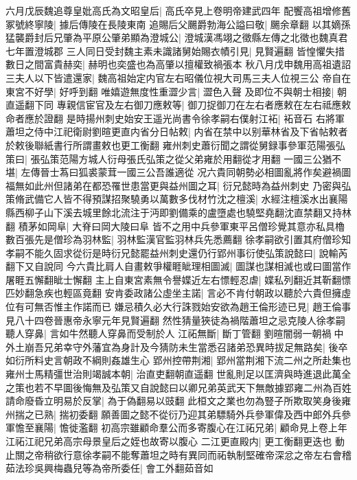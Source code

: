 六月戊辰魏追尊皇妣高氏為文昭皇后|{
	高氏卒見上卷明帝建武四年}
配饗高祖增修舊冢號終寧陵|{
	據后傳陵在長陵東南}
追賜后父颺爵勃海公謚曰敬|{
	颺余章翻}
以其嫡孫猛襲爵封后兄肇為平原公肇弟顯為澄城公|{
	澄城漢馮翊之徵縣左傳之北徵也魏真君七年置澄城郡}
三人同日受封魏主素未識諸舅始賜衣幘引見|{
	見賢遍翻}
皆惶懼失措數日之間富貴赫奕|{
	赫明也奕盛也為高肇以擅權致禍張本}
秋八月戊申魏用高祖遺詔三夫人以下皆遣還家|{
	魏高祖始定内官左右昭儀位視大司馬三夫人位視三公}
帝自在東宮不好學|{
	好呼到翻}
唯嬉遊無度性重澀少言|{
	澀色入聲}
及即位不與朝士相接|{
	朝直遥翻下同}
專親信宦官及左右御刀應敕等|{
	御刀捉御刀在左右者應敕在左右祗應敕命者應於證翻}
是時揚州刺史始安王遥光尚書令徐孝嗣右僕射江袥|{
	袥音石}
右將軍蕭坦之侍中江祀衛尉劉暄更直内省分日帖敕|{
	内省在禁中以别華林省及下省帖敕者於敕後聯紙書行所謂畫敕也更工衡翻}
雍州刺史蕭衍聞之謂從舅録事參軍范陽張弘策曰|{
	張弘策范陽方城人衍母張氏弘策之從父弟雍於用翻從才用翻}
一國三公猶不堪|{
	左傳晉士蒍曰狐裘蒙茸一國三公吾誰適從}
况六貴同朝勢必相圖亂將作矣避禍圖福無如此州但諸弟在都恐罹世患當更與益州圖之耳|{
	衍兄懿時為益州刺史}
乃密與弘策脩武備它人皆不得預謀招聚驍勇以萬數多伐材竹沈之檀溪|{
	水經注檀溪水出襄陽縣西柳子山下溪去城里餘北流注于沔即劉備乘的盧墮處也驍堅堯翻沈直禁翻又持林翻}
積茅如岡阜|{
	大脊曰岡大陵曰阜}
皆不之用中兵參軍東平呂僧珍覺其意亦私具櫓數百張先是僧珍為羽林監|{
	羽林監漢官監羽林兵先悉薦翻}
徐孝嗣欲引置其府僧珍知孝嗣不能久固求從衍是時衍兄懿罷益州刺史還仍行郢州事衍使弘策說懿曰|{
	說輸芮翻下又自說同}
今六貴比肩人自畫敕爭權睚眦理相圖滅|{
	圖謀也謀相滅也或曰圖當作屠睚五懈翻眦士懈翻}
主上自東宮素無令譽媟近左右慓輕忍虐|{
	媟私列翻近其靳翻慓匹妙翻急疾也輕區竟翻}
安肯委政諸公虛坐主諾|{
	言必不肯付朝政以聽於六貴但擁虛位有可無否惟主作諾而已}
嫌忌積久必大行誅戮始安欲為趙王倫形迹已見|{
	趙王倫事見八十四卷晉惠帝永寧元年見賢遍翻}
然性猜量狹徒為禍階蕭坦之忌克陵人徐孝嗣聽人穿鼻|{
	言如牛然聽人穿鼻而受制於人}
江祏無斷|{
	斷丁管翻}
劉暄闇弱一朝禍中外土崩吾兄弟幸守外藩宜為身計及今猜防未生當悉召諸弟恐異時拔足無路矣|{
	後卒如衍所料史言朝政不綱則姦雄生心}
郢州控帶荆湘|{
	郢州當荆湘下流二州之所赴集也}
雍州士馬精彊世治則竭誠本朝|{
	治直吏翻朝直遥翻}
世亂則足以匡濟與時進退此萬全之策也若不早圖後悔無及弘策又自說懿曰以卿兄弟英武天下無敵據郢雍二州為百姓請命廢昏立明易於反掌|{
	為于偽翻易以豉翻}
此桓文之業也勿為豎子所欺取笑身後雍州揣之已熟|{
	揣初委翻}
願善圖之懿不從衍乃迎其弟驃騎外兵參軍偉及西中郎外兵參軍憺至襄陽|{
	憺徙濫翻}
初高宗雖顧命羣公而多寄腹心在江祏兄弟|{
	顧命見上卷上年江祏江祀兄弟高宗母景皇后之姪也故寄以腹心}
二江更直殿内|{
	更工衡翻更迭也}
動止關之帝稍欲行意徐孝嗣不能奪蕭坦之時有異同而祏執制堅確帝深忿之帝左右會稽茹法珍吳興梅蟲兒等為帝所委任|{
	會工外翻茹音如}
